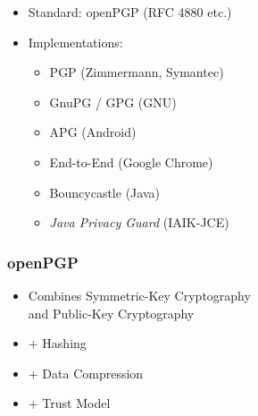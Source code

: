 \documentclass{beamer}
\begin{document}


\begin{frame}

	\begin{itemize}
		\item Standard: openPGP (RFC 4880 etc.)
		\item Implementations:
		\begin{itemize}
			\item PGP (Zimmermann, Symantec)
			\item GnuPG / GPG (GNU)
			\item APG (Android)
			\item End-to-End (Google Chrome)
			\item Bouncycastle (Java)
			\item \textit{Java Privacy Guard} (IAIK-JCE)
		\end{itemize}
	\end{itemize}

\end{frame}


\begin{frame}
	\frametitle{openPGP}
	
	\begin{itemize}
		\item Combines Symmetric-Key Cryptography \\and Public-Key Cryptography
		\item + Hashing
		\item + Data Compression
		\item + Trust Model 
	\end{itemize}
	
\end{frame}


\end{document}
